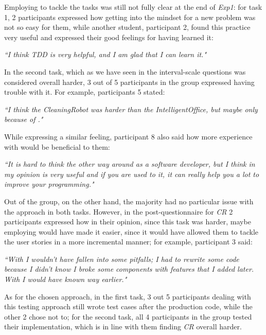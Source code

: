 Employing \tdd to tackle the tasks was still not fully clear at the end of \textit{Exp1}: for task 1, 2 participants expressed how getting into the \tdd mindset for a new problem was not so easy for them, while another student, participant 2, found this practice very useful and expressed their good feelings for having learned it:
\begin{mdframed}
    \textit{``I think TDD is very helpful, and I am glad that I can learn it."}
\end{mdframed}


In the second task, which as we have seen in the interval-scale questions was considered overall harder, 3 out of 5 participants in the \tdd group expressed having trouble with it.
For example, participants 5 stated:
\begin{mdframed}
    \textit{``I think the CleaningRobot was harder than the IntelligentOffice, but maybe only because of \tdd."}
\end{mdframed}

While expressing a similar feeling, participant 8 also said how more experience with \tdd would be beneficial to them:
\begin{mdframed}
    \textit{``It is hard to think the other way around as a software developer, but I think in my opinion \tdd is very useful and if you are used to it, it can really help you a lot to improve your programming."}
\end{mdframed}

Out of the \notdd group, on the other hand, the majority had no particular issue with the approach in both tasks.
However, in the post-questionnaire for \textit{CR} 2 participants expressed how in their opinion, since this task was harder, maybe employing \tdd would have made it easier, since it would have allowed them to tackle the user stories in a more incremental manner; for example, participant 3 said:
\begin{mdframed}
    \textit{``With \tdd I wouldn't have fallen into some pitfalls; I had to rewrite some code because I didn't know I broke some components with features that I added later. With \tdd I would have known way earlier."}
\end{mdframed}

As for the chosen \notdd approach, in the first task, 3 out 5 participants dealing with this testing approach still wrote test cases after the production code, while the other 2 chose not to; for the second task, all 4 participants in the \notdd group tested their implementation, which is in line with them finding \textit{CR} overall harder.


